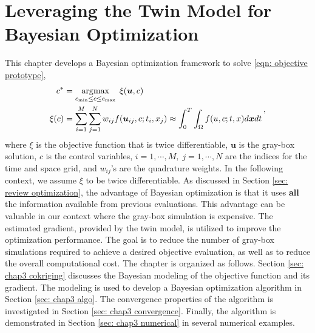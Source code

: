 \chapter{Leveraging the Twin Model for Bayesian Optimization}
\label{chapter 3}
This chapter develops a Bayesian optimization framework to solve \eqref{eqn: objective prototype},
\begin{equation*}\begin{split}
    c^* &= \argmax_{c_{\min}\le  c \le c_{\max}}\; \xi(\boldsymbol{u},c) \\
    \xi(c) &= \sum_{i=1}^M \sum_{j=1}^N w_{ij} f(\boldsymbol{u}_{ij},c; t_i,x_j)
    \approx \int_0^T \int_\Omega f(u,c; t,x)d\boldsymbol{x} d t%
\end{split}\,,\end{equation*}
where $\xi$ is the objective function that is twice differentiable, 
$\boldsymbol{u}$ is the gray-box solution, $c$ is the 
control variables, $i=1,\cdots,M, \; j=1,\cdots, N$ are the indices for the time and space
grid, and $w_{ij}$'s are the quadrature weights.
In the following context, we assume $\xi$ to be twice differentiable.
As discussed in Section \ref{sec: review optimization}, 
the advantage of Bayesian optimization is that it
uses \textbf{all} the information available from previous evaluations.
This advantage can be valuable in our context where the gray-box simulation is expensive.
The estimated gradient, provided by the twin model, is utilized 
to improve the optimization performance. The goal is to reduce the number of gray-box 
simulations required to achieve a desired objective evaluation, as well as
to reduce the overall computational cost. The chapter is organized as follows.
Section \ref{sec: chap3 cokriging} discusses the
Bayesian modeling of the objective function and its gradient. 
The modeling is used to develop a Bayesian optimization algorithm
in Section \ref{sec: chap3 algo}. The convergence properties of the algorithm is
investigated in Section \ref{sec: chap3 convergence}. Finally, the algorithm is demonstrated 
in Section \ref{sec: chap3 numerical} in several numerical examples.\\

